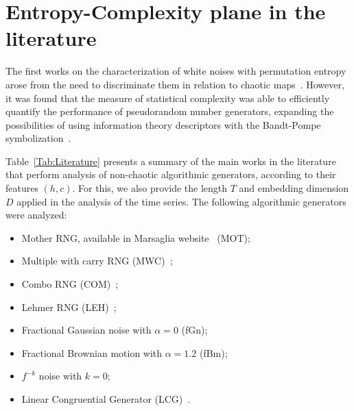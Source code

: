 \section{Entropy-Complexity plane in the literature}

The first works on the characterization of white noises with permutation entropy arose from the need to discriminate them in relation to chaotic maps~\cite{rosso2013characterization, xiong2020complexity, olivares2012contrasting}.
However, it was found that the measure of statistical complexity was able to efficiently quantify the performance of pseudorandom number generators, expanding the possibilities of using information theory descriptors with the Bandt-Pompe symbolization~\cite{larrondo2002statistical, gonzalez2005statistical}.

Table~\ref{Tab:Literature} presents a summary of the main works in the literature that perform analysis of non-chaotic algorithmic generators, according to their features $(h, c)$.
For this, we also provide the length $T$ and embedding dimension $D$ applied in the analysis of the time series.
The following algorithmic generators were analyzed:
\begin{itemize}
    \item Mother RNG, available in Marsaglia website~\cite{marsaglia1994yet} (MOT);
    \item Multiple with carry RNG (MWC)~\cite{marsaglia1994yet};
    \item Combo RNG (COM)~\cite{marsaglia1994yet};
    \item Lehmer RNG (LEH)~\cite{payne1969coding};
    \item Fractional Gaussian noise with $\alpha = 0$ (fGn);
    \item Fractional Brownian motion with $\alpha = 1.2$ (fBm);
    \item $f^{-k}$ noise with $k = 0$;
    \item Linear Congruential Generator (LCG)~\cite{knuth1997sorting}.
\end{itemize}

